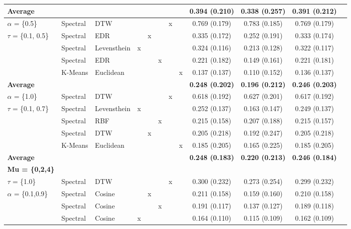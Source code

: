 \documentclass[12pt,a4paper,bibliography=totocnumbered,listof=totocnumbered]{scrartcl}
\begin{document}
\begin{table}[!htbp]
{\begin{tabular}{@{\extracolsep{0pt}} lllccccccccc}
			\hline
			\textbf{Average} &  &  &  &  &  &  &  &  \textbf{0.394 (0.210)} &  \textbf{0.338 (0.257)} &  \textbf{0.391 (0.212)} \\ 
			\hline
			$\alpha$ = \{0.5\} & Spectral & DTW &  &  &  & x &  & 0.769 (0.179) & 0.783 (0.185) & 0.769 (0.179) \\ 
			$\tau$ =  \{0.1, 0.5\} & Spectral & EDR &  & x &  &  &  & 0.335 (0.172) & 0.252 (0.191) & 0.333 (0.174) \\ 
			& Spectral & Levensthein & x &  &  &  &  & 0.324 (0.116) & 0.213 (0.128) & 0.322 (0.117) \\ 
			& Spectral & EDR &  &  & x &  &  & 0.221 (0.182) & 0.149 (0.161) & 0.221 (0.181) \\ 
			& K-Means & Euclidean &  &  &  &  & x & 0.137 (0.137) & 0.110 (0.152) & 0.136 (0.137) \\ 
			\hline
			\textbf{Average}  &  &  &  &  &  &  &  &  \textbf{0.248 (0.202)} &  \textbf{0.196 (0.212)} &  \textbf{0.246 (0.203)} \\ 
			\hline
			$\alpha$ = \{1.0\} & Spectral & DTW &  &  &  & x &  & 0.618 (0.192) & 0.627 (0.201) & 0.617 (0.192) \\ 
			$\tau$ = \{0.1, 0.7\} & Spectral & Levensthein & x &  &  &  &  & 0.252 (0.137) & 0.163 (0.147) & 0.249 (0.137) \\ 
			& Spectral & RBF &  &  & x &  &  & 0.215 (0.158) & 0.207 (0.188) & 0.215 (0.157) \\ 
			& Spectral & DTW &  & x &  &  &  & 0.205 (0.218) & 0.192 (0.247) & 0.205 (0.218) \\ 
			& K-Means & Euclidean &  &  &  &  & x & 0.185 (0.205) & 0.165 (0.225) & 0.185 (0.205) \\ 
			\hline
			\textbf{Average} &  &  &  &  &  &  &  &  \textbf{0.248 (0.183)} &  \textbf{0.220 (0.213)} &  \textbf{0.246 (0.184)} \\ 
			\hline
			\textbf{Mu = \{0,2,4\}}\tnote{*} &  &  &  &  &  &  &  &  &  &  \\ 
			\hline
			$\tau$ = \{1.0\}  & Spectral & DTW &  &  &  & x &  & 0.300 (0.232) & 0.273 (0.254) & 0.299 (0.232) \\ 
			$\alpha$ = \{0.1,0.9\} & Spectral & Cosine &  & x &  &  &  & 0.211 (0.158) & 0.159 (0.160) & 0.210 (0.158) \\ 
			& Spectral & Cosine &  &  & x &  &  & 0.191 (0.117) & 0.137 (0.127) & 0.189 (0.118) \\ 
			& Spectral & Cosine & x &  &  &  &  & 0.164 (0.110) & 0.115 (0.109) & 0.162 (0.109) \\ 

\end{tabular}}
\end{table}
\end{document}
